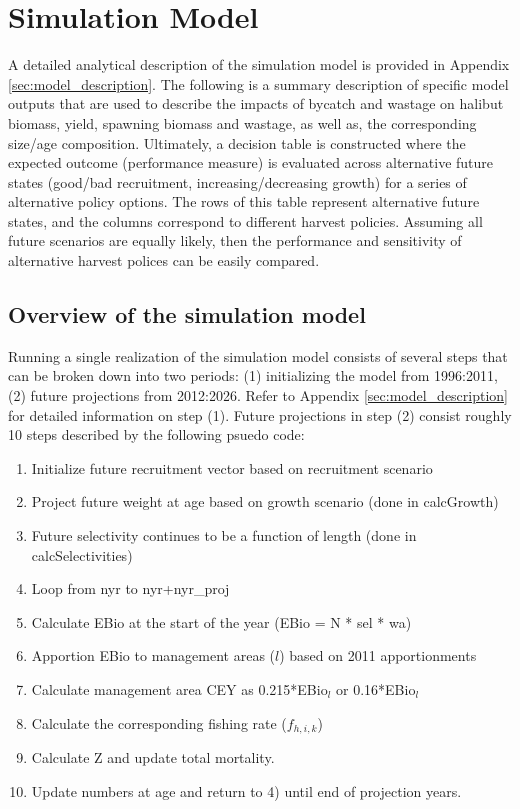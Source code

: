 
\section{Simulation Model} %
\label{sec:simulation_model}
A detailed analytical description of the simulation model is provided in Appendix \ref{sec:model_description}.  The following is a summary description of specific model outputs that are used to describe the impacts of bycatch and wastage on halibut biomass, yield, spawning biomass and wastage, as well as, the corresponding size/age composition.  Ultimately, a decision table is constructed where the expected outcome (performance measure) is evaluated across alternative future states (good/bad recruitment, increasing/decreasing growth) for a series of alternative policy options.  The rows of this table represent alternative future states, and the columns correspond to different harvest policies. Assuming all future scenarios are equally likely, then the performance and sensitivity of alternative harvest polices can be easily compared.

\subsection{Overview of the simulation model} %
\label{sub:overview_of_the_simulation_model}
 Running a single realization of the simulation model consists of several steps that can be broken down into two periods: (1) initializing the model from 1996:2011, (2) future projections from 2012:2026.  Refer to Appendix \ref{sec:model_description} for detailed information on step (1).  Future projections in step (2) consist roughly 10 steps described by the following psuedo code:
\begin{enumerate}
	\item	Initialize future recruitment vector based on recruitment scenario
	\item	Project future weight at age based on growth scenario  (done in calcGrowth)
	\item	Future selectivity continues to be a function of length (done in calcSelectivities)
	\item	Loop from nyr to nyr+nyr\_proj
	\item	Calculate EBio at the start of the year (EBio = N * sel * wa)
	\item	Apportion EBio to management areas ($l$) based on 2011 apportionments
	\item	Calculate management area CEY as 0.215*EBio$_l$ or 0.16*EBio$_l$
	\item	Calculate the corresponding fishing rate ($f_{h,i,k}$)
	\item	Calculate Z and update total mortality.
	\item	Update numbers at age and return to 4) until end of projection years.
\end{enumerate}

